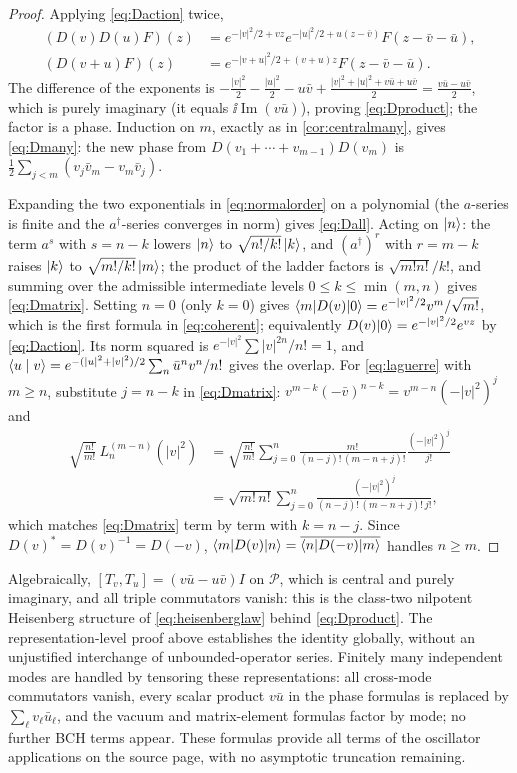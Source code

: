 \begin{proof}
Applying \eqref{eq:Daction} twice,
\begin{align*}
 (D(v)D(u)F)(z)&=e^{-|v|^2/2+vz}e^{-|u|^2/2+u(z-\bar v)}F(z-\bar v-\bar u),\\
 (D(v+u)F)(z)&=e^{-|v+u|^2/2+(v+u)z}F(z-\bar v-\bar u).
\end{align*}
The difference of the exponents is
$-\tfrac{|v|^2}2-\tfrac{|u|^2}2-u\bar v+\tfrac{|v|^2+|u|^2+v\bar u+u\bar v}2
=\tfrac{v\bar u-u\bar v}2$, which is purely imaginary (it equals
$\ii\operatorname{Im}(v\bar u)$), proving \eqref{eq:Dproduct}; the factor is
a phase. Induction on $m$, exactly as in \cref{cor:centralmany}, gives
\eqref{eq:Dmany}: the new phase from $D(v_1+\cdots+v_{m-1})D(v_m)$ is
$\frac12\sum_{j<m}(v_j\bar v_m-v_m\bar v_j)$.

Expanding the two exponentials in \eqref{eq:normalorder} on a polynomial
(the $a$-series is finite and the $a^\dagger$-series converges in norm)
gives \eqref{eq:Dall}. Acting on $\lvert n\rangle$: the term $a^s$ with $s=n-k$
lowers $\lvert n\rangle$ to $\sqrt{n!/k!}\,\lvert k\rangle$, and $(a^\dagger)^r$ with $r=m-k$
raises $\lvert k\rangle$ to $\sqrt{m!/k!}\,\lvert m\rangle$; the product of the ladder factors
is $\sqrt{m!n!}/k!$, and summing over the admissible intermediate levels
$0\leq k\leq\min(m,n)$ gives \eqref{eq:Dmatrix}. Setting $n=0$ (only $k=0$)
gives $\langle m\rvert D(v)\lvert0\rangle=e^{-|v|^2/2}v^m/\sqrt{m!}$, which is the first
formula in \eqref{eq:coherent}; equivalently
$D(v)\lvert0\rangle=e^{-|v|^2/2}e^{vz}$ by \eqref{eq:Daction}. Its norm squared is
$e^{-|v|^2}\sum|v|^{2n}/n!=1$, and
$\langle u\mid v\rangle=e^{-(|u|^2+|v|^2)/2}\sum_n\bar u^nv^n/n!$ gives the overlap.
For \eqref{eq:laguerre} with $m\geq n$, substitute $j=n-k$ in
\eqref{eq:Dmatrix}: $v^{m-k}(-\bar v)^{n-k}=v^{m-n}(-|v|^2)^j$ and
\begin{align*}
 \sqrt{\frac{n!}{m!}}\,L_n^{(m-n)}(|v|^2)
 &=\sqrt{\frac{n!}{m!}}\sum_{j=0}^{n}\frac{m!}{(n-j)!\,(m-n+j)!}\frac{(-|v|^2)^j}{j!}\\
 &=\sqrt{m!\,n!}\sum_{j=0}^{n}\frac{(-|v|^2)^j}{(n-j)!\,(m-n+j)!\,j!},
\end{align*}
which matches \eqref{eq:Dmatrix} term by term with $k=n-j$. Since
$D(v)^*=D(v)^{-1}=D(-v)$, $\langle m\rvert D(v)\lvert n\rangle=\overline{\langle n\rvert D(-v)\lvert m\rangle}$
handles $n\geq m$.
\end{proof}
Algebraically, $[T_v,T_u]=(v\bar u-u\bar v)I$ on $\mathcal P$, which is
central and purely imaginary, and all triple commutators vanish: this is
the class-two nilpotent Heisenberg structure of \eqref{eq:heisenberglaw}
behind \eqref{eq:Dproduct}. The representation-level proof above
establishes the identity globally, without an unjustified interchange of
unbounded-operator series. Finitely many independent modes are handled by
tensoring these representations: all cross-mode commutators vanish, every
scalar product $v\bar u$ in the phase formulas is replaced by
$\sum_\ell v_\ell\bar u_\ell$, and the vacuum and matrix-element formulas
factor by mode; no further BCH terms appear. These formulas provide all
terms of the oscillator applications on the source page, with no asymptotic
truncation remaining.
